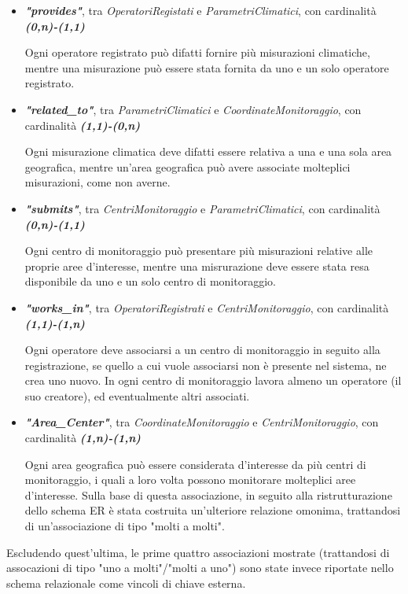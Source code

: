 \begin{itemize}
	\item \textbf{\textit{"provides"}}, tra \textit{OperatoriRegistati} e \textit{ParametriClimatici}, con cardinalità \textbf{\textit{(0,n)-(1,1)}}
	      
	      Ogni operatore registrato può difatti fornire più misurazioni climatiche, mentre una misurazione può essere stata fornita da uno e un solo operatore registrato.
	\item \textbf{\textit{"related\_to"}}, tra \textit{ParametriClimatici} e \textit{CoordinateMonitoraggio}, con cardinalità \textbf{\textit{(1,1)-(0,n)}}
	      
	      Ogni misurazione climatica deve difatti essere relativa a una e una sola area geografica, mentre un'area geografica può avere associate molteplici misurazioni, come non averne.
	\item \textbf{\textit{"submits"}}, tra \textit{CentriMonitoraggio} e \textit{ParametriClimatici}, con cardinalità \textbf{\textit{(0,n)-(1,1)}}
	      
	      Ogni centro di monitoraggio può presentare più misurazioni relative alle proprie aree d'interesse, mentre una misrurazione deve essere stata resa disponibile da uno e un solo centro di monitoraggio.
	\item \textbf{\textit{"works\_in"}}, tra \textit{OperatoriRegistrati} e \textit{CentriMonitoraggio}, con cardinalità \textbf{\textit{(1,1)-(1,n)}}
	      
	      Ogni operatore deve associarsi a un centro di monitoraggio in seguito alla registrazione, se quello a cui vuole associarsi non è presente nel sistema, ne crea uno nuovo. In ogni centro di monitoraggio lavora almeno un operatore (il suo creatore), ed eventualmente altri associati.
	\item \textbf{\textit{"Area\_Center"}}, tra \textit{CoordinateMonitoraggio} e \textit{CentriMonitoraggio}, con cardinalità \textbf{\textit{(1,n)-(1,n)}}
	      
	      Ogni area geografica può essere considerata d'interesse da più centri di monitoraggio, i quali a loro volta possono monitorare molteplici aree d'interesse.
	      Sulla base di questa associazione, in seguito alla ristrutturazione dello schema ER è stata costruita un'ulteriore relazione omonima, trattandosi di un'associazione di tipo "molti a molti".
\end{itemize}
Escludendo quest'ultima, le prime quattro associazioni mostrate (trattandosi di assocazioni di tipo "uno a molti"/"molti a uno") sono state invece riportate nello schema relazionale come vincoli di chiave esterna.
\pagebreak

